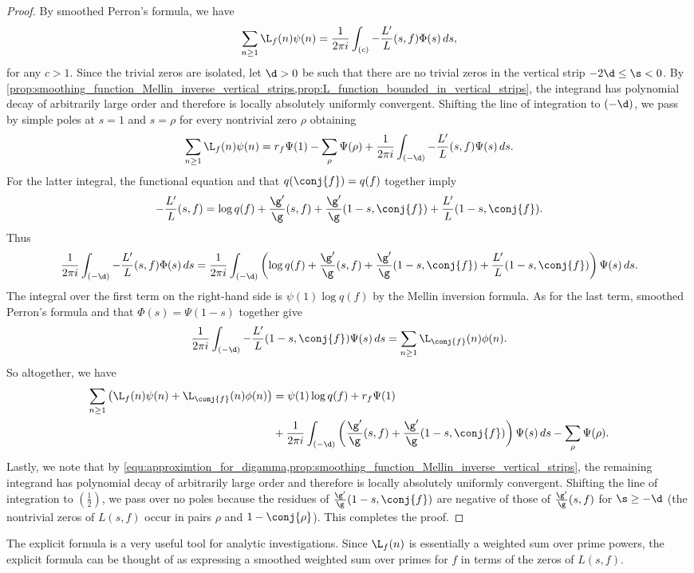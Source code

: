     \begin{proof}
      By smoothed Perron's formula, we have
      \[
        \sum_{n \ge 1}\L_{f}(n)\psi(n) = \frac{1}{2\pi i}\int_{(c)}-\frac{L'}{L}(s,f)\Phi(s)\,ds,
      \]
      for any $c > 1$. Since the trivial zeros are isolated, let $\d > 0$ be such that there are no trivial zeros in the vertical strip $-2\d \le \s < 0$. By \cref{prop:smoothing_function_Mellin_inverse_vertical_strips,prop:L_function_bounded_in_vertical_strips}, the integrand has polynomial decay of arbitrarily large order and therefore is locally absolutely uniformly convergent. Shifting the line of integration to $(-\d)$, we pass by simple poles at $s = 1$ and $s = \rho$ for every nontrivial zero $\rho$ obtaining
      \[
        \sum_{n \ge 1}\L_{f}(n)\psi(n) = r_{f}\Psi(1)-\sum_{\rho}\Psi(\rho)+\frac{1}{2\pi i}\int_{(-\d)}-\frac{L'}{L}(s,f)\Psi(s)\,ds.
      \]
      For the latter integral, the functional equation and that $q(\conj{f}) = q(f)$ together imply
      \[
        -\frac{L'}{L}(s,f) = \log{q(f)}+\frac{\g'}{\g}(s,f)+\frac{\g'}{\g}(1-s,\conj{f})+\frac{L'}{L}(1-s,\conj{f}).
      \]
      Thus
      \[
        \frac{1}{2\pi i}\int_{(-\d)}-\frac{L'}{L}(s,f)\Phi(s)\,ds = \frac{1}{2\pi i}\int_{(-\d)}\left(\log{q(f)}+\frac{\g'}{\g}(s,f)+\frac{\g'}{\g}(1-s,\conj{f})+\frac{L'}{L}(1-s,\conj{f})\right)\Psi(s)\,ds.
      \]
      The integral over the first term on the right-hand side is $\psi(1)\log{q(f)}$ by the Mellin inversion formula. As for the last term, smoothed Perron's formula and that $\Phi(s) = \Psi(1-s)$ together give
      \[
        \frac{1}{2\pi i}\int_{(-\d)}-\frac{L'}{L}(1-s,\conj{f})\Psi(s)\,ds = \sum_{n \ge 1}\L_{\conj{f}}(n)\phi(n).
      \]
      So altogether, we have
      \begin{align*}
        \sum_{n \ge 1}\left(\L_{f}(n)\psi(n)+\L_{\conj{f}}(n)\phi(n)\right) &= \psi(1)\log{q(f)}+r_{f}\Psi(1) \\
        &+ \frac{1}{2\pi i}\int_{(-\d)}\left(\frac{\g'}{\g}(s,f)+\frac{\g'}{\g}(1-s,\conj{f})\right)\Psi(s)\,ds-\sum_{\rho}\Psi(\rho).
      \end{align*}
      Lastly, we note that by \cref{equ:approximtion_for_digamma,prop:smoothing_function_Mellin_inverse_vertical_strips}, the remaining integrand has polynomial decay of arbitrarily large order and therefore is locally absolutely uniformly convergent. Shifting the line of integration to $\left(\frac{1}{2}\right)$, we pass over no poles because the residues of $\frac{\g'}{\g}(1-s,\conj{f})$ are negative of those of $\frac{\g'}{\g}(s,f)$ for $\s \ge -\d$ (the nontrivial zeros of $L(s,f)$ occur in pairs $\rho$ and $1-\conj{\rho}$). This completes the proof. 
    \end{proof}

    The explicit formula is a very useful tool for analytic investigations. Since $\L_{f}(n)$ is essentially a weighted sum over prime powers, the explicit formula can be thought of as expressing a smoothed weighted sum over primes for $f$ in terms of the zeros of $L(s,f)$.